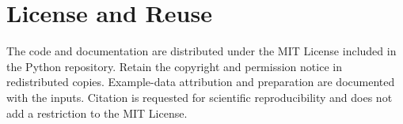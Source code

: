 \documentclass[12pt]{article}
\begin{document}
\section*{License and Reuse}
The code and documentation are distributed under the MIT License included in the Python repository. Retain the copyright and permission notice in redistributed copies. Example-data attribution and preparation are documented with the inputs. Citation is requested for scientific reproducibility and does not add a restriction to the MIT License.

\nocite{*}


\end{document}
